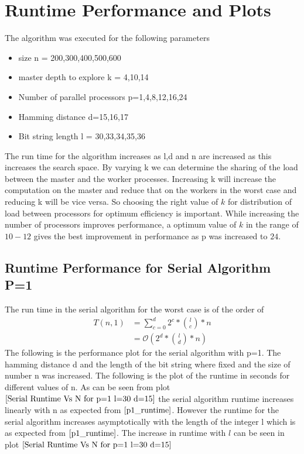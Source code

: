 \documentclass[twoside,11pt]{article}\usepackage{amsmath,amsfonts,amsthm,fullpage}
\begin{document}
\pagebreak
\section{Runtime Performance and Plots}
The algorithm was executed for the following parameters
\begin{itemize}
\item
size n = 200,300,400,500,600
\item
master depth to explore k = 4,10,14
\item
Number of parallel processors p=1,4,8,12,16,24
\item
Hamming distance d=15,16,17
\item
Bit string length l = 30,33,34,35,36
\end{itemize}
The run time for the algorithm increases as l,d and n are increased as this increases the search space. By varying k we can determine the sharing of the load between the master and the worker processes. Increasing k will increase the computation on the master and reduce that on the workers in the worst case and reducing k will be vice versa. So choosing the right value of $k$ for distribution of load between processors for optimum efficiency is important. While increasing the number of processors improves performance, a optimum value of $k$ in the range of $10-12$ gives the best improvement in performance as p was increased to $24$. 

\subsection{Runtime Performance for Serial Algorithm P=1}
 The run time in the serial algorithm for the worst case is of the order of 
\begin{align}
T(n,1)&= \sum_{c=0}^{d} 2^c *{l\choose c} * n\nonumber\\
&=\mathcal{O}( 2^d * {l\choose d} * n ) \label{p1_runtime}
\end{align} 
The following is the performance plot for the serial algorithm with p=1. The hamming distance d and the length of the bit string where fixed and the size of number n was increased. The following is the plot of the runtime in seconds for different values of n. As can be seen from plot $\eqref{Serial Runtime Vs N for p=1 l=30 d=15}$ the serial algorithm runtime increases linearly with n as expected from $\eqref{p1_runtime}$. However the runtime for the serial algorithm increases asymptotically with the length of the integer l which is  as expected from $\eqref{p1_runtime}$. The increase in runtime with $l$ can be seen in plot $\eqref{Serial Runtime Vs N for p=1 l=30 d=15}$
\end{document}
